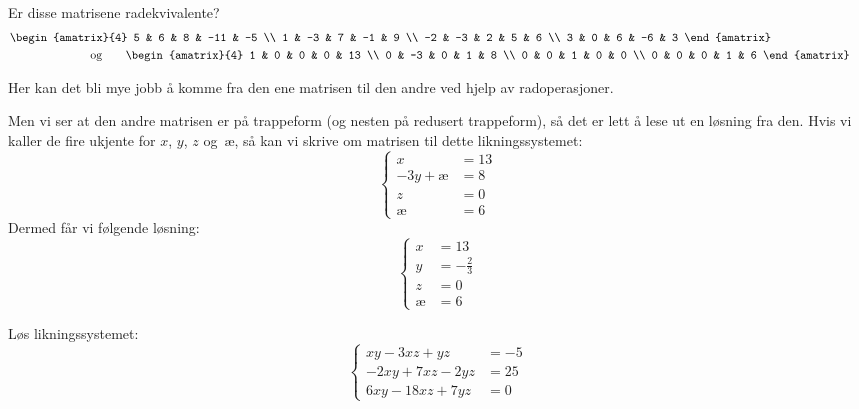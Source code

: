 \begin{oppgave}
Er disse matrisene radekvivalente?
\begin{gather*}
\begin{amatrix}{4}
5 & 6 & 8 & -11 & -5 \\
1 & -3 & 7 & -1 & 9 \\
-2 & -3 & 2 & 5 & 6 \\
3 & 0 & 6 & -6 & 3
\end{amatrix}
\hspace{80pt}
\\
\hspace{55pt}\text{og}\qquad
\begin{amatrix}{4}
1 & 0 & 0 & 0 & 13 \\
0 & -3 & 0 & 1 & 8 \\
0 & 0 & 1 & 0 & 0 \\
0 & 0 & 0 & 1 & 6
\end{amatrix}
\end{gather*}
\end{oppgave}

\begin{losning}
Her kan det bli mye jobb å komme fra den ene matrisen til den andre
ved hjelp av radoperasjoner.

Men vi ser at den andre matrisen er på trappeform (og nesten på
redusert trappeform), så det er lett å lese ut en løsning fra den.
Hvis vi kaller de fire ukjente for $x$, $y$, $z$ og~$æ$, så kan vi
skrive om matrisen til dette likningssystemet:
\[
\left\{
\begin{aligned}
x &= 13 \\
-3y + æ &= 8 \\
z &= 0 \\
æ &= 6
\end{aligned}
\right.
\]
Dermed får vi følgende løsning:
\[
\left\{
\begin{aligned}
x &= 13 \\
y &= -\frac{2}{3} \\
z &= 0 \\
æ &= 6
\end{aligned}
\right.
\]

\end{losning}


\begin{oppgave}
Løs likningssystemet:
\[
\left\{
\begin{aligned}
    xy -  3xz +  yz &= -5 \\
  -2xy +  7xz - 2yz &= 25 \\
   6xy - 18xz + 7yz &= 0
\end{aligned}
\right.
\]
\end{oppgave}

